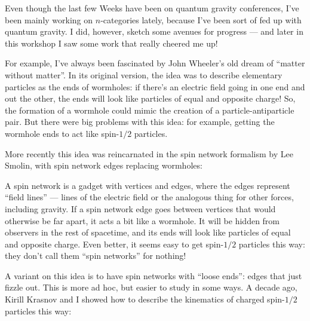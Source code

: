 \documentclass{article}
\def\tightlist{}
\renewcommand{\texttt}[1]{%
  \begingroup
  \ttfamily
  \begingroup\lccode`~=`/\lowercase{\endgroup\def~}{/\discretionary{}{}{}}%
  \begingroup\lccode`~=`[\lowercase{\endgroup\def~}{[\discretionary{}{}{}}%
  \begingroup\lccode`~=`.\lowercase{\endgroup\def~}{.\discretionary{}{}{}}%
  \catcode`/=\active\catcode`[=\active\catcode`.=\active
  \scantokens{#1\noexpand}%
  \endgroup
}
\begin{document}
Even though the last few Weeks have been on quantum gravity conferences,
I've been mainly working on \(n\)-categories lately, because I've been
sort of fed up with quantum gravity. I did, however, sketch some avenues
for progress --- and later in this workshop I saw some work that really
cheered me up!

For example, I've always been fascinated by John Wheeler's old dream of
``matter without matter''. In its original version, the idea was to
describe elementary particles as the ends of wormholes: if there's an
electric field going in one end and out the other, the ends will look
like particles of equal and opposite charge! So, the formation of a
wormhole could mimic the creation of a particle-antiparticle pair. But
there were big problems with this idea: for example, getting the
wormhole ends to act like spin-\(1/2\) particles.

More recently this idea was reincarnated in the spin network formalism
by Lee Smolin, with spin network edges replacing wormholes:


A spin network is a gadget with vertices and edges, where the edges
represent ``field lines'' --- lines of the electric field or the
analogous thing for other forces, including gravity. If a spin network
edge goes between vertices that would otherwise be far apart, it acts a
bit like a wormhole. It will be hidden from observers in the rest of
spacetime, and its ends will look like particles of equal and opposite
charge. Even better, it seems easy to get spin-\(1/2\) particles this
way: they don't call them ``spin networks'' for nothing!

A variant on this idea is to have spin networks with ``loose ends'':
edges that just fizzle out. This is more ad hoc, but easier to study in
some ways. A decade ago, Kirill Krasnov and I showed how to describe the
kinematics of charged spin-\(1/2\) particles this way:

\end{document}
